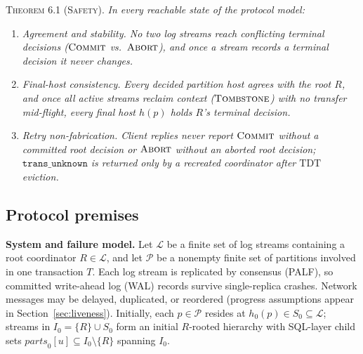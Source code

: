 \documentclass[sigconf,nonacm]{acmart}
\newcommand{\stCom}{\textsc{Commit}}
\newcommand{\stAbt}{\textsc{Abort}}
\newcommand{\stTomb}{\textsc{Tombstone}}
\newcommand{\parts}{\mathit{parts}}
\begin{document}
\noindent\textsc{Theorem 6.1 (Safety).}
\emph{In every reachable state of the protocol model:}
\begin{enumerate}
  \item[\emph{(a)}] \emph{Agreement and stability. No two log streams reach
    conflicting terminal decisions (\(\stCom\) vs.\ \(\stAbt\)), and once a
    stream records a terminal decision it never changes.}
  \item[\emph{(b)}] \emph{Final-host consistency. Every decided partition
    host agrees with the root \(R\), and once all active streams reclaim
    context (\(\stTomb\)) with no transfer mid-flight, every final host
    \(h(p)\) holds \(R\)'s terminal decision.}
  \item[\emph{(c)}] \emph{Retry non-fabrication. Client replies never
    report \(\stCom\) without a committed root decision or \(\stAbt\) without
    an aborted root decision; \(\mathtt{trans\_unknown}\) is returned only by
    a recreated coordinator after \(\mathrm{TDT}\) eviction.}
\end{enumerate}

\subsection*{Protocol premises}
\begingroup
\setlength{\parindent}{0pt}
\setlength{\parskip}{0.25\baselineskip}
\textbf{System and failure model.} Let \(\mathcal{L}\) be a finite set of
log streams containing a root coordinator \(R \in \mathcal{L}\), and let
\(\mathcal{P}\) be a nonempty finite set of partitions involved in one
transaction \(T\). Each log stream is replicated by consensus (PALF), so
committed write-ahead log (WAL) records survive single-replica crashes.
Network messages may be delayed, duplicated, or reordered (progress
assumptions appear in Section~\ref{sec:liveness}). Initially, each
\(p \in \mathcal{P}\) resides at \(h_0(p) \in S_0 \subseteq \mathcal{L}\);
streams in \(I_0 = \{R\} \cup S_0\) form an initial \(R\)-rooted hierarchy
with SQL-layer child sets \(\parts_0[u] \subseteq I_0 \setminus \{R\}\)
spanning \(I_0\).
\end{document}
